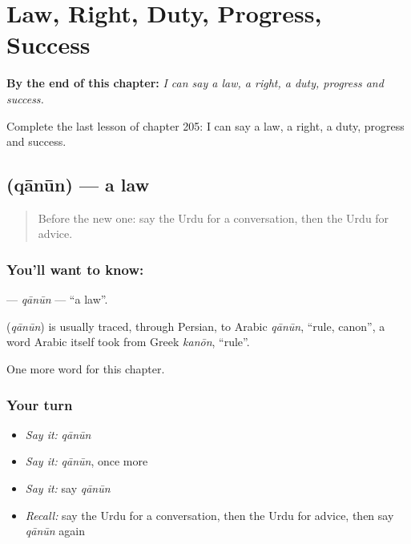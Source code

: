 
\chapter{Law, Right, Duty, Progress, Success}
\label{ch:ur-law-right-duty-progress-success}

\begin{chapteropening}
\textbf{By the end of this chapter:} \emph{I can say a law, a right, a duty, progress and success.}

Complete the last lesson of chapter 205: I can say a law, a right, a duty, progress and success.
\end{chapteropening}

\section[\texorpdfstring{\ur{قانون} (qānūn)}{قانون (qānūn)}]{ (qānūn) — a law}

\label{lesson:UR-C205-qanun}



\begin{quote}
Before the new one: say the Urdu for a conversation, then the Urdu for advice.
\end{quote}

\subsection*{You'll want to know: }
\textbf{} — \emph{qānūn} — \textquotedblleft{}a law\textquotedblright{}.

\begin{cousinweb}
\textbf{} (\emph{qānūn}) is usually traced, through Persian, to Arabic \emph{qānūn}, \textquotedblleft{}rule, canon\textquotedblright{}, a word Arabic itself took from Greek \emph{kanōn}, \textquotedblleft{}rule\textquotedblright{}.
\end{cousinweb}

\begin{grammarlens}[title={What you've built}]
One more word for this chapter.
\end{grammarlens}

\subsection*{Your turn}
\begin{itemize}
\raggedright
  \item \emph{Say it:} \emph{qānūn}
  \item \emph{Say it:} \emph{qānūn}, once more
  \item \emph{Say it:} say \emph{qānūn}
  \item \emph{Recall:} say the Urdu for a conversation, then the Urdu for advice, then say \emph{qānūn} again
\end{itemize}

